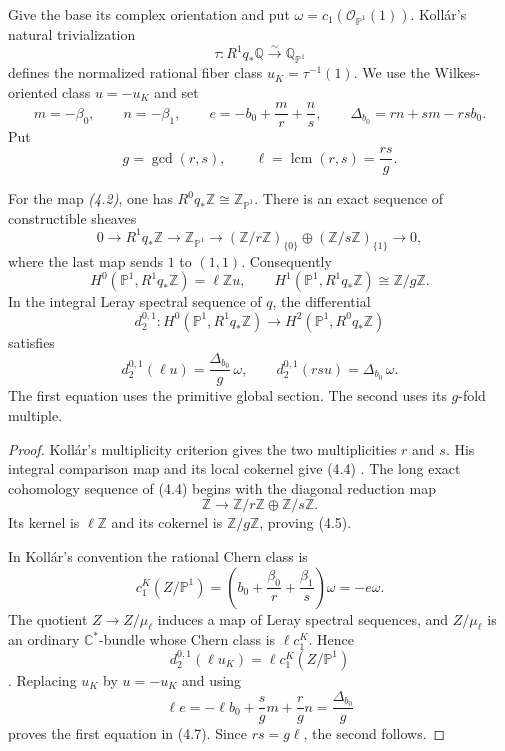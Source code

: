 \documentclass[11pt]{article}
\numberwithin{equation}{section}
\begin{document}
Give the base its complex orientation and put
$\omega=c_1(\mathcal O_{\mathbb P^1}(1))$.
Koll\'ar's natural trivialization
\[
 \tau:R^1q_*\mathbb Q\xrightarrow{\sim}\mathbb Q_{\mathbb P^1}
\]
defines the normalized rational fiber class $u_K=\tau^{-1}(1)$.
We use the Wilkes-oriented class $u=-u_K$ and set
\[
 m=-\beta_0,\qquad n=-\beta_1,\qquad
 e=-b_0+\frac mr+\frac ns,\qquad
 \Delta_{b_0}=rn+sm-rsb_0.                                      \tag{4.3}
\]
Put
\[
 g=\gcd(r,s),\qquad \ell=\operatorname{lcm}(r,s)=\frac{rs}{g}.
\]

\begin{theorem}
For the map \emph{(4.2)}, one has
$R^0q_*\mathbb Z\cong\mathbb Z_{\mathbb P^1}$.
There is an exact sequence of constructible sheaves
\[
 0\longrightarrow R^1q_*\mathbb Z\longrightarrow
 \mathbb Z_{\mathbb P^1}\longrightarrow
 (\mathbb Z/r\mathbb Z)_{\{0\}}\oplus
 (\mathbb Z/s\mathbb Z)_{\{1\}}\longrightarrow0,                \tag{4.4}
\]
where the last map sends $1$ to $(1,1)$. Consequently
\[
 H^0(\mathbb P^1,R^1q_*\mathbb Z)=\ell\mathbb Z u,\qquad
 H^1(\mathbb P^1,R^1q_*\mathbb Z)\cong\mathbb Z/g\mathbb Z.       \tag{4.5}
\]
In the integral Leray spectral sequence of $q$, the differential
\[
 d_2^{0,1}:H^0(\mathbb P^1,R^1q_*\mathbb Z)
       \longrightarrow H^2(\mathbb P^1,R^0q_*\mathbb Z)          \tag{4.6}
\]
satisfies
\[
 d_2^{0,1}(\ell u)=\frac{\Delta_{b_0}}g\,\omega,\qquad
 d_2^{0,1}(rsu)=\Delta_{b_0}\,\omega.                            \tag{4.7}
\]
The first equation uses the primitive global section.
The second uses its $g$-fold multiple.
\end{theorem}

\begin{proof}
Koll\'ar's multiplicity criterion gives the two multiplicities $r$ and $s$.
His integral comparison map and its local cokernel give (4.4)
\cite[Theorem~7 and Propositions~43 and 47]{Kollar}.  The long exact
cohomology sequence of (4.4) begins with the diagonal reduction map
\[
 \mathbb Z\longrightarrow\mathbb Z/r\mathbb Z\oplus
 \mathbb Z/s\mathbb Z.
\]
Its kernel is $\ell\mathbb Z$ and its cokernel is
$\mathbb Z/g\mathbb Z$, proving (4.5).

In Koll\'ar's convention the rational Chern class is
\[
 c_1^K(Z/\mathbb P^1)
   =\left(b_0+\frac{\beta_0}{r}+\frac{\beta_1}{s}\right)\omega
   =-e\omega.                                                     \tag{4.8}
\]
The quotient $Z\to Z/\mu_\ell$ induces a map of Leray spectral sequences,
and $Z/\mu_\ell$ is an ordinary $\mathbb C^*$-bundle whose Chern class is
$\ell c_1^K$.  Hence
\[
 d_2^{0,1}(\ell u_K)=\ell c_1^K(Z/\mathbb P^1)
\]
\cite[Definition~9, Map~13, and Corollary~44]{Kollar}.  Replacing $u_K$ by
$u=-u_K$ and using
\[
 \ell e=-\ell b_0+\frac{s}{g}m+\frac{r}{g}n
          =\frac{\Delta_{b_0}}g
\]
proves the first equation in (4.7).  Since $rs=g\ell$, the second follows.
\end{proof}
\end{document}
